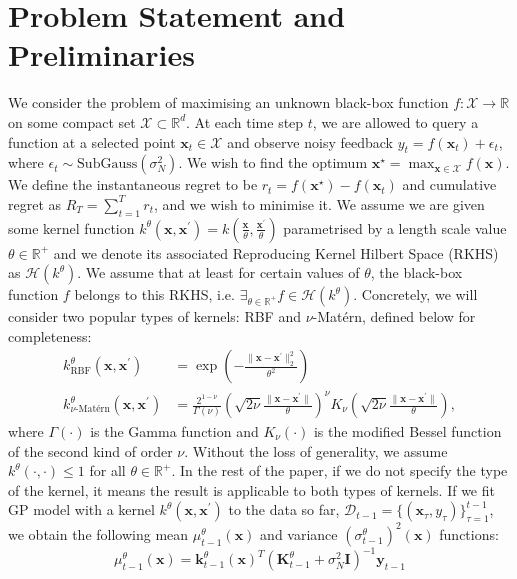 \documentclass{article}
\theoremstyle{plain}
\theoremstyle{definition}
\theoremstyle{remark}
\theoremstyle{plain}
\begin{document}
\section{Problem Statement and Preliminaries}
 We consider the problem of maximising an unknown black-box function $f: \mathcal{X} \to \mathbb{R}$ on some compact set $\mathcal{X} \subset \mathbb{R}^d$. At each time step $t$, we are allowed to query a function at a selected point $\bm{x}_t \in \mathcal{X}$ and observe noisy feedback $y_t = f(\bm{x}_t) + \epsilon_t$, where $\epsilon_t \sim \textrm{SubGauss}(\sigma_N^2)$. We wish to find the optimum $\bm{x}^\star = \max_{\bm{x}\in \mathcal{X}}f(\bm{x})$. We define the instantaneous regret to be $r_t = f(\bm{x}^\star) - f(\bm{x}_t)$ and cumulative regret as $R_T = \sum_{t=1}^T r_t$, and we wish to minimise it. We assume we are given some kernel function $k^\theta(\bm{x}, \bm{x}^\prime) = k(\frac{\bm{x}}{\theta}, \frac{\bm{x}^\prime}{\theta})$ parametrised by a length scale value $\theta \in \mathbb{R}^+$ and we denote its associated Reproducing Kernel Hilbert Space (RKHS) as $\mathcal{H}(k^{\theta})$. We assume that at least for certain values of $\theta$, the black-box function $f$ belongs to this RKHS, i.e. $\exists_{\theta \in \mathbb{R}^+} f \in \mathcal{H}(k^\theta)$. Concretely, we will consider two popular types of kernels: RBF and $\nu$-Matérn, defined below for completeness:
\begin{align*}
    k_{\textrm{RBF}}^{\theta}(\bm{x}, \bm{x}^\prime) &= \exp \left(- \frac{\lVert \bm{x} - \bm{x}^\prime \rVert_2^2}{\theta^2}  \right) \\
    k_{\textrm{$\nu$-Matérn}}^{\theta}(\bm{x}, \bm{x}^\prime) &= \frac{2^{1-\nu}}{\Gamma(\nu)} \left( \sqrt{2\nu} \frac{\|\bm{x} - \bm{x}^\prime \|}{\theta} \right)^\nu K_\nu \left( \sqrt{2\nu} \frac{\|\bm{x} - \bm{x}^\prime\|}{\theta} \right),
\end{align*}
where $\Gamma(\cdot)$ is the Gamma function and $K_{\nu}(\cdot)$ is the modified Bessel function of the second kind of order 
$\nu$. Without the loss of generality, we assume $k^\theta(\cdot, \cdot) \le 1$ for all $\theta \in \mathbb{R}^+$. In the rest of the paper, if we do not specify the type of the kernel, it means the result is applicable to both types of kernels. If we fit GP model with a kernel $k^\theta(\bm{x}, \bm{x}^\prime)$ to the data so far, $\mathcal{D}_{t-1} = \{(\bm{x}_\tau, y_\tau)\}_{\tau=1}^{t-1} $, we obtain the following mean $\mu^\theta_{t-1}(\bm{x}) $ and variance $(\sigma^\theta_{t-1})^2(\bm{x})$ functions:
\begin{equation*}
    \mu^\theta_{t-1}(\bm{x}) = \bm{k}^\theta_{t-1}(\bm{x})^T(\mathbf{K}^\theta_{t-1} + \sigma_N^2\mathbf{I})^{-1}\bm{y}_{t-1}
\end{equation*}
\end{document}
